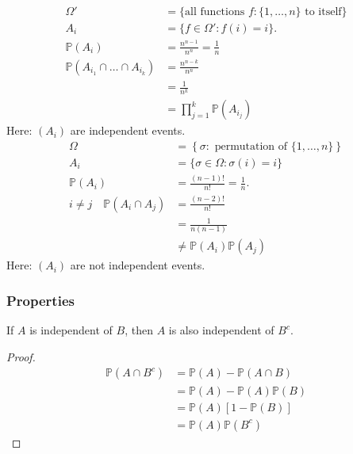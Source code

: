 \begin{example}[Independence] ~\vspace*{-1.5\baselineskip} \label{exm:indep1}
    \begin{itemize}
        \mathitem
        \begin{align*}
            \Omega' &= \{\text{all functions } f : \{1, \dots, n\} \text{ to itself} \} \\
            A_i &= \{f \in \Omega' : f(i) = i\}. \\
            \mathbb{P}(A_i) &= \frac{n^{n -1}}{n^n} = \frac{1}{n} \\
            \mathbb{P}(A_{i_1} \cap \dots \cap A_{i_k}) &= \frac{n^{n -k}}{n^n} \\
            &= \frac{1}{n^k} \\
            &= \prod_{j = 1}^k \mathbb{P}(A_{i_j})
        \end{align*} 
        Here: $(A_i)$ are independent events.
        \mathitem
        \begin{align*}
            \Omega &= \left\{\sigma : \text{ permutation of } \{1, \dots, n\} \right\} \\
            A_i &= \{ \sigma \in \Omega : \sigma(i) = i \} \\
            \mathbb{P}(A_i) &= \frac{(n - 1)!}{n!} = \frac{1}{n}. \\
            i \neq j \quad \mathbb{P}(A_i \cap A_j) &= \frac{(n - 2)!}{n!} \\
            &= \frac{1}{n(n - 1)} \\
            &\neq \mathbb{P}(A_i) \mathbb{P}(A_j)
        \end{align*} 
        Here: $(A_i)$ are not independent events.
    \end{itemize} 
\end{example} 

\subsubsection{Properties}
\begin{claim}
    If $A$ is independent of $B$, then $A$ is also independent of $B^c$.
\end{claim} 

\begin{proof}
    \begin{align*}
        \mathbb{P}(A \cap B^c) &= \mathbb{P}(A) - \mathbb{P}(A \cap B) \\
        &= \mathbb{P}(A) - \mathbb{P}(A)\mathbb{P}(B) \\
        &= \mathbb{P}(A) [1 - \mathbb{P}(B)] \\
        &= \mathbb{P}(A) \mathbb{P}(B^c)
    \end{align*}  
\end{proof} 

